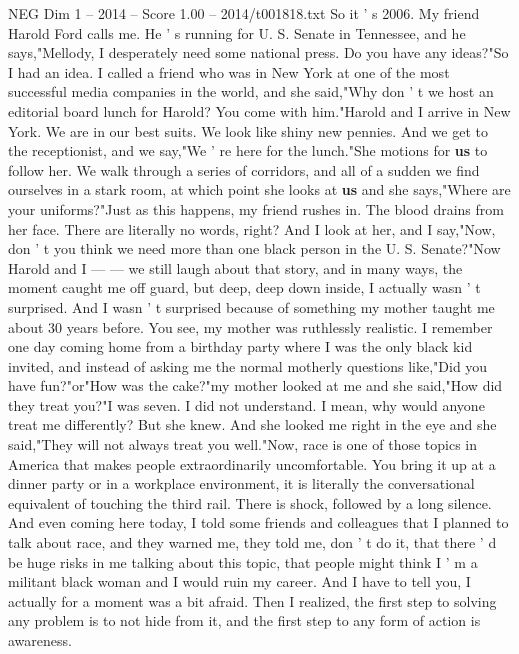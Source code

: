 \begin{textsample}{NEG Dim 1 – 2014 – Score 1.00 – 2014/t001818.txt}  \label{ex:f1_neg_035}
So it ' s 2006.
My friend Harold Ford calls me.
He ' s running for U.
S.
Senate in Tennessee, and he says,"Mellody, I desperately need some national press.
Do you have any ideas?"So I had an idea.
I called a friend who was in New York at one of the most successful media companies in the world, and she said,"Why don ' t we host an editorial board lunch for Harold?
You come with him."Harold and I arrive in New York.
We are in our best suits.
We look like shiny new pennies.
And we get to the receptionist, and we say,"We ' re here for the lunch."She motions for \textbf{us} to follow her.
We walk through a series of corridors, and all of a sudden we find ourselves in a stark room, at which point she looks at \textbf{us} and she says,"Where are your uniforms?"Just as this happens, my friend rushes in.
The blood drains from her face.
There are literally no words, right?
And I look at her, and I say,"Now, don ' t you think we need more than one black person in the U.
S.
Senate?"Now Harold and I — — we still laugh about that story, and in many ways, the moment caught me off guard, but deep, deep down inside, I actually wasn ' t surprised.
And I wasn ' t surprised because of something my mother taught me about 30 years before.
You see, my mother was ruthlessly realistic.
I remember one day coming home from a birthday party where I was the only black kid invited, and instead of asking me the normal motherly questions like,"Did you have fun?"or"How was the cake?"my mother looked at me and she said,"How did they treat you?"I was seven.
I did not understand.
I mean, why would anyone treat me differently?
But she knew.
And she looked me right in the eye and she said,"They will not always treat you well."Now, race is one of those topics in America that makes people extraordinarily uncomfortable.
You bring it up at a dinner party or in a workplace environment, it is literally the conversational equivalent of touching the third rail.
There is shock, followed by a long silence.
And even coming here today, I told some friends and colleagues that I planned to talk about race, and they warned me, they told me, don ' t do it, that there ' d be huge risks in me talking about this topic, that people might think I ' m a militant black woman and I would ruin my career.
And I have to tell you, I actually for a moment was a bit afraid.
Then I realized, the first step to solving any problem is to not hide from it, and the first step to any form of action is awareness.

\end{textsample}
